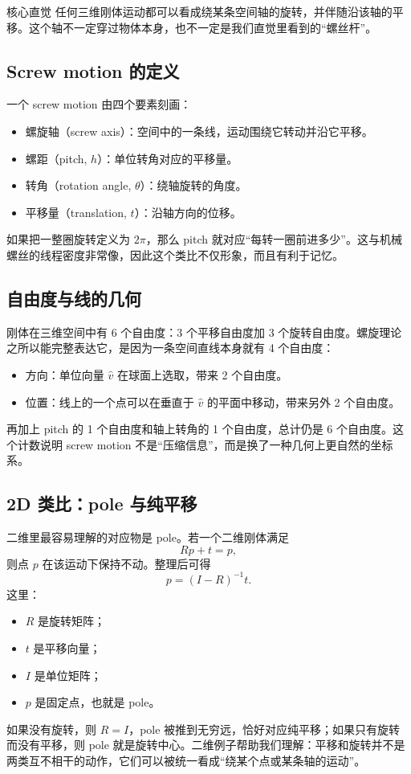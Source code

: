 \documentclass[a4paper]{article}
\begin{document}
\begin{knowledgebox}{核心直觉}
任何三维刚体运动都可以看成绕某条空间轴的旋转，并伴随沿该轴的平移。这个轴不一定穿过物体本身，也不一定是我们直觉里看到的“螺丝杆”。
\end{knowledgebox}

\subsection{Screw motion 的定义}
一个 screw motion 由四个要素刻画：
\begin{itemize}
  \item 螺旋轴（screw axis）：空间中的一条线，运动围绕它转动并沿它平移。
  \item 螺距（pitch, $h$）：单位转角对应的平移量。
  \item 转角（rotation angle, $\theta$）：绕轴旋转的角度。
  \item 平移量（translation, $t$）：沿轴方向的位移。
\end{itemize}
如果把一整圈旋转定义为 $2\pi$，那么 pitch 就对应“每转一圈前进多少”。这与机械螺丝的线程密度非常像，因此这个类比不仅形象，而且有利于记忆。

\subsection{自由度与线的几何}
刚体在三维空间中有 6 个自由度：3 个平移自由度加 3 个旋转自由度。螺旋理论之所以能完整表达它，是因为一条空间直线本身就有 4 个自由度：
\begin{itemize}
  \item 方向：单位向量 $\hat{v}$ 在球面上选取，带来 2 个自由度。
  \item 位置：线上的一个点可以在垂直于 $\hat{v}$ 的平面中移动，带来另外 2 个自由度。
\end{itemize}
再加上 pitch 的 1 个自由度和轴上转角的 1 个自由度，总计仍是 6 个自由度。这个计数说明 screw motion 不是“压缩信息”，而是换了一种几何上更自然的坐标系。

\subsection{2D 类比：pole 与纯平移}
二维里最容易理解的对应物是 pole。若一个二维刚体满足
\[
Rp + t = p,
\]
则点 $p$ 在该运动下保持不动。整理后可得
\[
p = (I - R)^{-1} t.
\]
这里：
\begin{itemize}
  \item $R$ 是旋转矩阵；
  \item $t$ 是平移向量；
  \item $I$ 是单位矩阵；
  \item $p$ 是固定点，也就是 pole。
\end{itemize}
如果没有旋转，则 $R = I$，pole 被推到无穷远，恰好对应纯平移；如果只有旋转而没有平移，则 pole 就是旋转中心。二维例子帮助我们理解：平移和旋转并不是两类互不相干的动作，它们可以被统一看成“绕某个点或某条轴的运动”。
\end{document}
